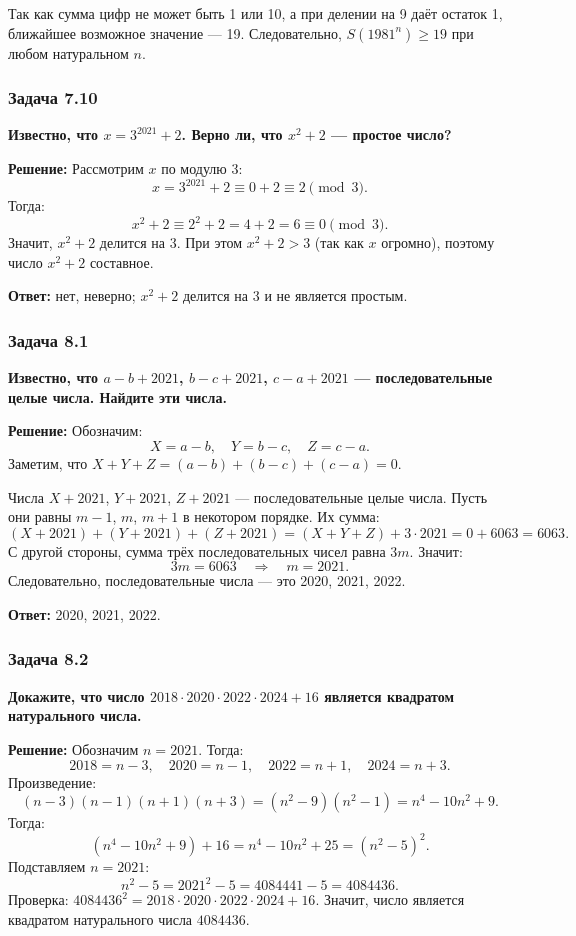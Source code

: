 \documentclass[12pt, a4paper]{article}
\begin{document}
Так как сумма цифр не может быть 1 или 10, а при делении на 9 даёт остаток 1, ближайшее возможное значение — 19. Следовательно, \(S(1981^n) \ge 19\) при любом натуральном \(n\).

\subsubsection*{Задача 7.10}
\textbf{Известно, что $x = 3^{2021} + 2$. Верно ли, что $x^2 + 2$ — простое число?}

\textbf{Решение:}
Рассмотрим $x$ по модулю 3:
\[
x = 3^{2021} + 2 \equiv 0 + 2 \equiv 2 \pmod{3}.
\]
Тогда:
\[
x^2 + 2 \equiv 2^2 + 2 = 4 + 2 = 6 \equiv 0 \pmod{3}.
\]
Значит, $x^2 + 2$ делится на 3. При этом $x^2 + 2 > 3$ (так как $x$ огромно), поэтому число $x^2 + 2$ составное.

\textbf{Ответ:} нет, неверно; $x^2 + 2$ делится на 3 и не является простым.

\subsubsection*{Задача 8.1}
\textbf{Известно, что $a - b + 2021$, $b - c + 2021$, $c - a + 2021$ — последовательные целые числа. Найдите эти числа.}

\textbf{Решение:}
Обозначим:
\[
X = a - b, \quad Y = b - c, \quad Z = c - a.
\]
Заметим, что $X + Y + Z = (a-b) + (b-c) + (c-a) = 0$.

Числа $X + 2021$, $Y + 2021$, $Z + 2021$ — последовательные целые числа. Пусть они равны $m-1$, $m$, $m+1$ в некотором порядке. Их сумма:
\[
(X + 2021) + (Y + 2021) + (Z + 2021) = (X+Y+Z) + 3 \cdot 2021 = 0 + 6063 = 6063.
\]
С другой стороны, сумма трёх последовательных чисел равна $3m$. Значит:
\[
3m = 6063 \quad\Rightarrow\quad m = 2021.
\]
Следовательно, последовательные числа — это 2020, 2021, 2022.

\textbf{Ответ:} 2020, 2021, 2022.

\subsubsection*{Задача 8.2}
\textbf{Докажите, что число $2018 \cdot 2020 \cdot 2022 \cdot 2024 + 16$ является квадратом натурального числа.}

\textbf{Решение:}
Обозначим $n = 2021$. Тогда:
\[
2018 = n - 3,\quad 2020 = n - 1,\quad 2022 = n + 1,\quad 2024 = n + 3.
\]
Произведение:
\[
(n-3)(n-1)(n+1)(n+3) = (n^2 - 9)(n^2 - 1) = n^4 - 10n^2 + 9.
\]
Тогда:
\[
(n^4 - 10n^2 + 9) + 16 = n^4 - 10n^2 + 25 = (n^2 - 5)^2.
\]
Подставляем $n = 2021$:
\[
n^2 - 5 = 2021^2 - 5 = 4084441 - 5 = 4084436.
\]
Проверка: $4084436^2 = 2018 \cdot 2020 \cdot 2022 \cdot 2024 + 16$. Значит, число является квадратом натурального числа $4084436$.
\end{document}
